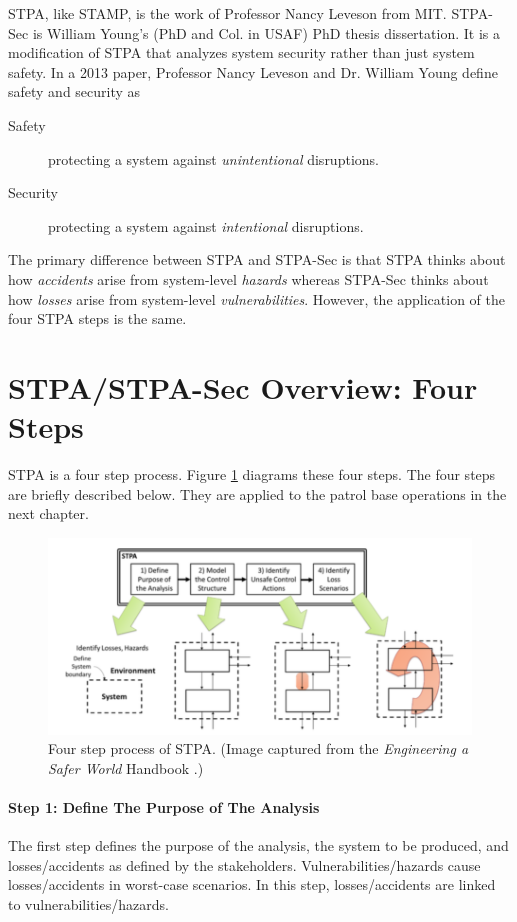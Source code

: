\documentclass[../../main/main.tex]{subfiles}
\begin{document}
STPA, like STAMP, is the work of Professor Nancy Leveson from MIT.  STPA-Sec is William Young's (PhD and Col. in USAF) PhD thesis dissertation.  It is a modification of STPA that analyzes system security rather than just system safety.  In a 2013 paper, Professor Nancy Leveson and Dr. William Young define safety and security as
\begin{description}
\item[ Safety ] protecting a system against \textit{unintentional} disruptions.
\item[ Security ] protecting a system against \textit{intentional} disruptions.
\end{description}
The primary difference between STPA and STPA-Sec is that STPA thinks about how \textit{accidents} arise from system-level \textit{hazards} whereas STPA-Sec thinks about how \textit{losses} arise from system-level \textit{vulnerabilities}.  However, the application of the four STPA steps is the same.


\section{STPA/STPA-Sec Overview: Four Steps}
STPA is a four step process.  Figure \ref{4step} diagrams these four steps.  The four steps are briefly described below.  They are applied to the patrol base operations in the next chapter. 


\begin{figure}[h]
\includegraphics[width=\linewidth]{../figures/4step}
\caption{\label{4step} Four step process of STPA. (Image captured from the \textit{Engineering a Safer World} Handbook \cite{safe}.)}
\end{figure}

\paragraph*{Step 1: Define The Purpose of The Analysis}
The first step defines the purpose of the analysis, the system to be produced, and losses/accidents as defined by the stakeholders.  Vulnerabilities/hazards cause losses/accidents in worst-case scenarios.  In this step, losses/accidents are linked to vulnerabilities/hazards.  
\end{document}
